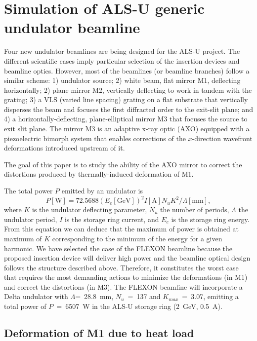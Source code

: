 \documentclass[preprint]{iucr}
\begin{document}
%
%
%
\section{Simulation of ALS-U generic undulator beamline}
\label{sec:main}

Four new undulator beamlines are being designed for the ALS-U project. The different scientific cases imply particular selection of the insertion devices and beamline optics. However, most of the beamlines (or beamline branches) follow a similar scheme: 1) undulator source; 2) white beam, flat mirror M1, deflecting horizontally; 2) plane mirror M2, vertically deflecting to work in tandem with the grating; 3) a VLS (varied line spacing) grating on a flat substrate that vertically disperses the beam and focuses the first diffracted order to the exit-slit plane; and 4) a horizontally-deflecting, plane-elliptical mirror M3 that focuses the source to exit slit plane. The mirror M3 is an adaptive x-ray optic (AXO) equipped with a piezoelectric bimorph system that enables corrections of the $x$-direction wavefront deformations introduced upstream of it.

The goal of this paper is to study the ability of the AXO mirror to correct the distortions produced by thermally-induced deformation of M1.

The total power $P$ emitted by an undulator is 
\begin{equation}
    P[\textrm{W}] = 72.5688 (E_e [\textrm{GeV}])^2  I[\textrm{A}]  N_u  K^2 / \Lambda[\textrm{mm}],
\end{equation}
where $K$ is the undulator deflecting parameter, $N_u$ the number of periods, $\Lambda$ the undulator period, $I$ is the storage ring current, and $E_e$ is the storage ring energy. From this equation we can deduce that the maximum of power is obtained at maximum of $K$ corresponding to the minimum of the energy for a given harmonic.  We have selected the case of the FLEXON beamline because the proposed insertion device will deliver high power and the beamline optical design follows the structure described above. Therefore, it constitutes the worst case that requires the most demanding actions to minimize the deformations (in M1) and correct the distortions (in M3). The FLEXON beamline will incorporate a Delta undulator \cite{deltaundulator} with $\Lambda$=~28.8~mm, $N_u$~=~137 and $K_{max}$~=~3.07, emitting a total power of $P$~=~6507~W in the ALS-U storage ring (2~GeV, 0.5~A).

\subsection{Deformation of M1 due to heat load}
\end{document}
